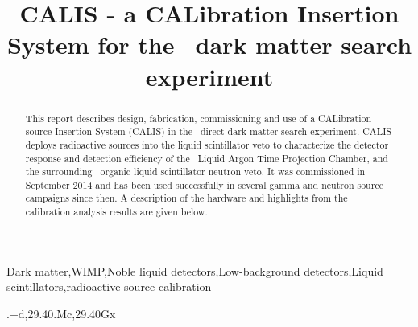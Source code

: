 \documentclass[preprint,12pt]{elsarticle}
\begin{document}
\begin{frontmatter}
\title{CALIS - a CALibration Insertion System for the \dsf\, dark matter search experiment}
%


\begin{abstract}
This report describes design, fabrication, commissioning and use of  a CALibration source Insertion System (CALIS) in the \dsf\ direct dark matter search experiment. CALIS  deploys radioactive sources into the liquid scintillator veto to characterize the detector response and detection efficiency of the \dsf\ Liquid Argon Time Projection Chamber, and the surrounding \lsvscintillatormass\ organic liquid scintillator neutron veto.
It was commissioned in September 2014 and has been used successfully in several gamma and neutron source campaigns since then. A description of the hardware and highlights from the calibration analysis results are given below.


\end{abstract}
\begin{keyword}


Dark matter\sep WIMP\sep Noble liquid detectors\sep Low-background detectors\sep Liquid scintillators\sep radioactive source calibration

.+d\sep 29.40.Mc\sep 29.40Gx

\end{keyword}

\end{frontmatter}
\end{document}
